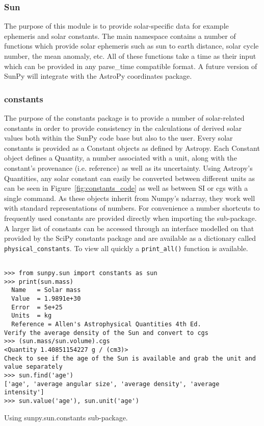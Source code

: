 \subsubsection{Sun}
The purpose of this module is to provide solar-specific data for example ephemeris and
solar constants. The main namespace contains a number of functions which provide solar
ephemeris such as sun to earth distance, solar cycle number, the mean anomaly, etc.
All of these functions take a time as their input which can be provided in any parse_time
compatible format. A future version of SunPy will integrate with the AstroPy coordinates package.


\subsubsection{constants}
The purpose of the constants package is to provide a number of solar-related 
constants in order to provide consistency in the calculations of derived solar 
values both within the SunPy code base but also to the user. Every solar 
constants is provided as a Constant objects as defined by Astropy. Each 
Constant object defines a Quantity, a number associated with a unit, along with 
the constant's provenance (i.e. reference) as well as its uncertainty. Using 
Astropy's Quantities, any solar constant can easily be converted between 
different units as can be seen in Figure~\ref{fig:constants_code} as well
as between SI or cgs with a single command.  As these objects inherit from 
Numpy's ndarray, they work well with standard representations of numbers.
For convenience a number shortcuts to frequently used constants are provided 
directly when importing the sub-package. A larger list of constants can be 
accessed through an interface modelled on that provided by the SciPy constants 
package and are available as a dictionary called \texttt{physical\_constants}. 
To view all quickly a \texttt{print\_all()} function is available.

\begin{listing}[h]
\begin{verbatim}

>>> from sunpy.sun import constants as sun
>>> print(sun.mass)
  Name   = Solar mass
  Value  = 1.9891e+30
  Error  = 5e+25
  Units  = kg
  Reference = Allen's Astrophysical Quantities 4th Ed.
Verify the average density of the Sun and convert to cgs
>>> (sun.mass/sun.volume).cgs
<Quantity 1.40851154227 g / (cm3)>
Check to see if the age of the Sun is available and grab the unit and value separately
>>> sun.find('age')
['age', 'average angular size', 'average density', 'average intensity']
>>> sun.value('age'), sun.unit('age')

\end{verbatim}
\caption{Using sunpy.sun.constants sub-package.}
\label{code:constants_code}
\end{listing}
	